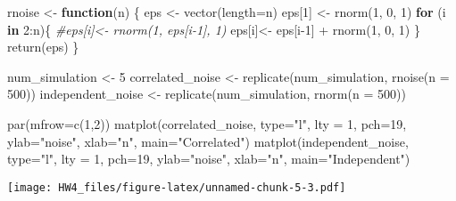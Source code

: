 \documentclass[
]{article}
\newenvironment{Shaded}{\begin{snugshade}}{\end{snugshade}}
\newcommand{\AttributeTok}[1]{\textcolor[rgb]{0.77,0.63,0.00}{#1}}
\newcommand{\CommentTok}[1]{\textcolor[rgb]{0.56,0.35,0.01}{\textit{#1}}}
\newcommand{\ControlFlowTok}[1]{\textcolor[rgb]{0.13,0.29,0.53}{\textbf{#1}}}
\newcommand{\DecValTok}[1]{\textcolor[rgb]{0.00,0.00,0.81}{#1}}
\newcommand{\FunctionTok}[1]{\textcolor[rgb]{0.00,0.00,0.00}{#1}}
\newcommand{\NormalTok}[1]{#1}
\newcommand{\OtherTok}[1]{\textcolor[rgb]{0.56,0.35,0.01}{#1}}
\newcommand{\SpecialCharTok}[1]{\textcolor[rgb]{0.00,0.00,0.00}{#1}}
\newcommand{\StringTok}[1]{\textcolor[rgb]{0.31,0.60,0.02}{#1}}
\begin{document}
\begin{Shaded}
\begin{Highlighting}[]
\NormalTok{rnoise }\OtherTok{\textless{}{-}} \ControlFlowTok{function}\NormalTok{(n) \{}
\NormalTok{  eps }\OtherTok{\textless{}{-}} \FunctionTok{vector}\NormalTok{(}\AttributeTok{length=}\NormalTok{n)}
\NormalTok{  eps[}\DecValTok{1}\NormalTok{] }\OtherTok{\textless{}{-}} \FunctionTok{rnorm}\NormalTok{(}\DecValTok{1}\NormalTok{, }\DecValTok{0}\NormalTok{, }\DecValTok{1}\NormalTok{)}
  \ControlFlowTok{for}\NormalTok{ (i }\ControlFlowTok{in} \DecValTok{2}\SpecialCharTok{:}\NormalTok{n)\{}
    \CommentTok{\#eps[i]\textless{}{-} rnorm(1, eps[i{-}1], 1)}
\NormalTok{    eps[i]}\OtherTok{\textless{}{-}}\NormalTok{ eps[i}\DecValTok{{-}1}\NormalTok{] }\SpecialCharTok{+} \FunctionTok{rnorm}\NormalTok{(}\DecValTok{1}\NormalTok{, }\DecValTok{0}\NormalTok{, }\DecValTok{1}\NormalTok{)}
\NormalTok{  \}}
  \FunctionTok{return}\NormalTok{(eps)}
\NormalTok{\}}


\NormalTok{num\_simulation }\OtherTok{\textless{}{-}} \DecValTok{5}
\NormalTok{correlated\_noise }\OtherTok{\textless{}{-}} \FunctionTok{replicate}\NormalTok{(num\_simulation, }\FunctionTok{rnoise}\NormalTok{(}\AttributeTok{n =} \DecValTok{500}\NormalTok{)) }
\NormalTok{independent\_noise }\OtherTok{\textless{}{-}} \FunctionTok{replicate}\NormalTok{(num\_simulation, }\FunctionTok{rnorm}\NormalTok{(}\AttributeTok{n =} \DecValTok{500}\NormalTok{))}

\FunctionTok{par}\NormalTok{(}\AttributeTok{mfrow=}\FunctionTok{c}\NormalTok{(}\DecValTok{1}\NormalTok{,}\DecValTok{2}\NormalTok{))}
\FunctionTok{matplot}\NormalTok{(correlated\_noise, }\AttributeTok{type=}\StringTok{"l"}\NormalTok{, }\AttributeTok{lty =} \DecValTok{1}\NormalTok{, }\AttributeTok{pch=}\DecValTok{19}\NormalTok{, }\AttributeTok{ylab=}\StringTok{"noise"}\NormalTok{, }\AttributeTok{xlab=}\StringTok{"n"}\NormalTok{, }\AttributeTok{main=}\StringTok{"Correlated"}\NormalTok{)}
\FunctionTok{matplot}\NormalTok{(independent\_noise, }\AttributeTok{type=}\StringTok{"l"}\NormalTok{, }\AttributeTok{lty =} \DecValTok{1}\NormalTok{, }\AttributeTok{pch=}\DecValTok{19}\NormalTok{, }\AttributeTok{ylab=}\StringTok{"noise"}\NormalTok{, }\AttributeTok{xlab=}\StringTok{"n"}\NormalTok{, }\AttributeTok{main=}\StringTok{"Independent"}\NormalTok{)}
\end{Highlighting}
\end{Shaded}

\texttt{[image: HW4\_files/figure-latex/unnamed-chunk-5-3.pdf]}
\end{document}
